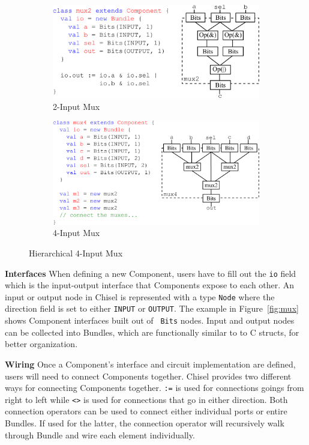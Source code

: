 \begin{figure}
\centering
  \begin{subfigure}[t]{0.48\textwidth}
  \centering
  \includegraphics[width=\textwidth]{figures/mux2.pdf}
  \caption{2-Input Mux}
  \label{fig:mux2}
  \end{subfigure}
  \hfill
  \begin{subfigure}[t]{0.48\textwidth}
  \centering
  \includegraphics[width=\textwidth]{figures/mux4.pdf}
  \caption{4-Input Mux}
  \label{fig:mux4}
  \end{subfigure}
  \caption{Hierarchical 4-Input Mux}
  \label{fig:muxcomp}
\end{figure}

{\bf Interfaces} When defining a new Component, users have to fill out
the {\tt io} field which is the input-output interface that
Components expose to each other. An input or output node in Chisel is
represented with a type {\tt Node} where the direction field is set to
either {\tt INPUT} or {\tt OUTPUT}. The example in
Figure~\ref{fig:mux} shows Component interfaces built out of {\tt
Bits} nodes. Input and output nodes can be
collected into Bundles, which are functionally similar to to C
structs, for better organization. 

{\bf Wiring} Once a Component's interface and circuit
implementation are defined, users will need to connect Components
together. Chisel provides two different ways for connecting
Components together. {\tt :=} is used for connections goings from
right to left while {\tt <>} is used for connections that go in either
direction. Both connection operators can be used to connect either individual
ports or entire Bundles. If used for the latter, the connection
operator will recursively walk through Bundle and wire each element
individually.

